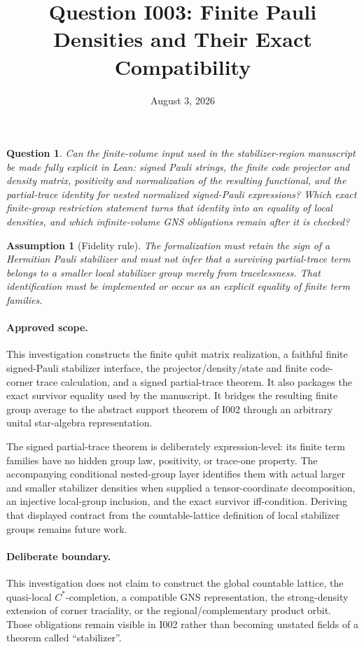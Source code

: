 \documentclass[11pt,reqno]{amsart}
\title{Question I003: Finite Pauli Densities and Their Exact Compatibility}
\date{August 3, 2026}
\newtheorem{question}{Question}
\newtheorem{assumption}{Assumption}
\begin{document}
\maketitle

\begin{question}
Can the finite-volume input used in the stabilizer-region manuscript be made
fully explicit in Lean: signed Pauli strings, the finite code projector and
density matrix, positivity and normalization of the resulting functional, and
the partial-trace identity for nested normalized signed-Pauli expressions?
Which exact finite-group restriction statement turns that identity into an
equality of local densities, and which infinite-volume GNS obligations remain
after it is checked?
\end{question}

\begin{assumption}[Fidelity rule]
The formalization must retain the sign of a Hermitian Pauli stabilizer and
must not infer that a surviving partial-trace term belongs to a smaller local
stabilizer group merely from tracelessness.  That identification must be
implemented or occur as an explicit equality of finite term families.
\end{assumption}

\paragraph{Approved scope.}
This investigation constructs the finite qubit matrix realization, a faithful
finite signed-Pauli stabilizer interface, the projector/density/state and
finite code-corner trace calculation, and a signed partial-trace theorem.  It
also packages the exact survivor equality used by the manuscript.  It bridges
the resulting finite group average to the abstract support theorem of I002
through an arbitrary unital star-algebra representation.

The signed partial-trace theorem is deliberately expression-level: its finite
term families have no hidden group law, positivity, or trace-one property.
The accompanying conditional nested-group layer identifies them with actual
larger and smaller stabilizer densities when supplied a tensor-coordinate
decomposition, an injective local-group inclusion, and the exact survivor
iff-condition.  Deriving that displayed contract from the countable-lattice
definition of local stabilizer groups remains future work.

\paragraph{Deliberate boundary.}
This investigation does not claim to construct the global countable lattice,
the quasi-local $C^*$-completion, a compatible GNS representation, the
strong-density extension of corner traciality, or the regional/complementary
product orbit.  Those obligations remain visible in I002 rather than becoming
unstated fields of a theorem called ``stabilizer''. 
\end{document}
